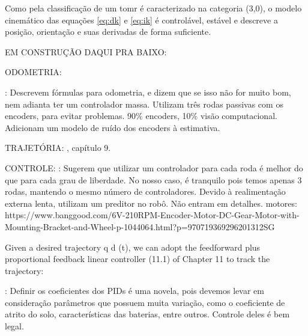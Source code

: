 Como pela classificação de \cite{campion1996structural} um \acrshort{tomr} é caracterizado na categoria (3,0), o modelo cinemático das equações \ref{eq:dk} e \ref{eq:ik} é controlável, estável e descreve a posição, orientação e suas derivadas de forma suficiente. %

EM CONSTRUÇÃO DAQUI PRA BAIXO:


ODOMETRIA:
\cite{lynch2017modern}

\cite{samani2007comprehensive}: Descrevem fórmulas para odometria, e dizem que se isso não for muito bom, nem adianta ter um controlador massa. Utilizam três rodas passivas com os encoders, para evitar problemas. 90\% encoders, 10\% visão computacional. Adicionam um modelo de ruído dos encoders à estimativa.

TRAJETÓRIA:
\cite{lynch2017modern}, capítulo 9.

CONTROLE:
\cite{rojas2006holonomic}: Sugerem que utilizar um controlador para cada roda é melhor do que para cada grau de liberdade. No nosso caso, é tranquilo pois temos apenas 3 rodas, mantendo o mesmo número de controladores. Devido à realimentação externa lenta, utilizam um preditor no robô. Não entram em detalhes.
motores:
https://www.banggood.com/6V-210RPM-Encoder-Motor-DC-Gear-Motor-with-Mounting-Bracket-and-Wheel-p-1044064.html?p=970719369296201312SG

Given a desired trajectory q d (t), we can adopt the feedforward plus proportional feedback linear controller (11.1) of Chapter 11 to track the trajectory: \cite{lynch2017modern}

\cite{samani2007comprehensive}: Definir os coeficientes dos PIDs é uma novela, pois devemos levar em consideração parâmetros que possuem muita variação, como o coeficiente de atrito do solo, características das baterias, entre outros. Controle deles é bem legal.





